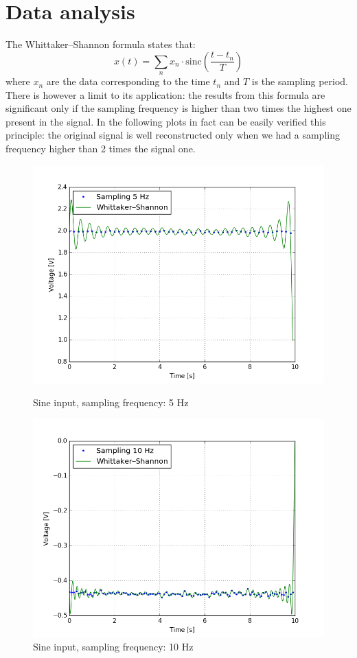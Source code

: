 \section{Data analysis}
The Whittaker–Shannon formula states that:
\[x(t) = \sum_n x_n\cdot\text{sinc}\left(\frac{t-t_n}{T}\right)\]
where $x_n$ are the data corresponding to the time $t_n$ and $T$ is the sampling period.
There is however a limit to its application: the results from this formula are significant only if the sampling frequency is higher than two times the highest one present in the signal. In the following plots in fact can be easily verified this principle: the original signal is well reconstructed only when we had a sampling frequency higher than 2 times the signal one. 
\begin{figure}[H]
\centering
\begin{minipage}{.5\textwidth}
  \centering
\includegraphics[width=\textwidth]{13/5Hz.png}
\caption{Sine input, sampling frequency: 5 Hz}
\end{minipage}\hfill
\begin{minipage}{.5\textwidth}
  \centering
\includegraphics[width=\textwidth]{13/10Hz.png}
\caption{Sine input, sampling frequency: 10 Hz}
\end{minipage}
\end{figure}
